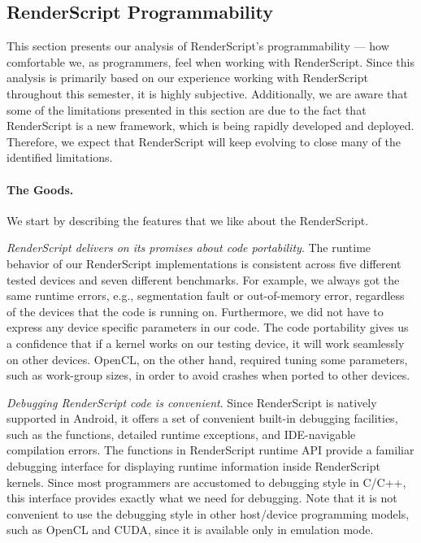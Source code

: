 \subsection{RenderScript Programmability}
This section presents our analysis of RenderScript's programmability --- how
comfortable we, as programmers, feel when working with RenderScript. Since this
analysis is primarily based on our experience working with RenderScript
throughout this semester, it is highly subjective. Additionally, we are aware
that some of the limitations presented in this section are due to the fact that
RenderScript is a new framework, which is being rapidly developed and deployed.
Therefore, we expect that RenderScript will keep evolving to close many of the
identified limitations.

\paragraph{The Goods.}
We start by describing the features that we like about the RenderScript.

\textit{RenderScript delivers on its promises about code portability}.
The runtime behavior of our RenderScript implementations is consistent across
five different tested devices and seven different benchmarks. For example, we
always got the same runtime errors, e.g., segmentation fault or out-of-memory
error, regardless of the devices that the code is running on. Furthermore, we
did not have to express any device specific parameters in our code. The code
portability gives us a confidence that if a kernel works on our testing device,
it will work seamlessly on other devices. OpenCL, on the other hand, required
tuning some
parameters, such as work-group sizes, in order to avoid crashes when ported to
other devices.

\textit{Debugging RenderScript code is convenient}. Since RenderScript is
natively supported in Android, it offers a set of convenient built-in debugging
facilities, such as the  functions, detailed runtime exceptions,
and IDE-navigable compilation errors. The  functions in
RenderScript runtime API provide a familiar debugging interface for displaying
runtime information inside RenderScript kernels. Since most programmers are accustomed
to  debugging style in C/C++, this interface provides exactly
what we need for debugging. Note that it is not convenient to use the
 debugging style in other host/device programming models, such as
OpenCL and CUDA, since it is available only in emulation mode.

